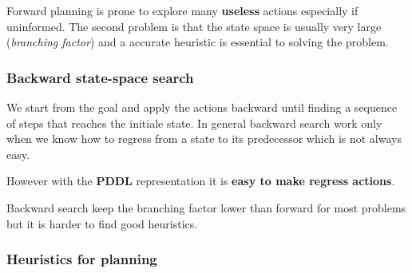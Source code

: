 Forward  planning  is prone  to  explore  many \textbf{useless}  actions
especially if uninformed. The second problem  is that the state space is
usually  very  large  (\textit{branching factor})  and  a  accurate
heuristic is essential to solving the problem.

\subsubsection{Backward state-space search}

We start  from the goal and  apply the actions backward  until finding a
sequence of steps  that reaches the initiale state.  In general backward
search  work  only  when  we  know  how  to  regress  from  a  state  to
its  predecessor  which  is  not  always easy.  

However with the \textbf{PDDL} representation it is \textbf{easy to make regress actions}.

Backward search  keep the  branching factor lower  than forward  for most
problems but it is harder to find good heuristics.


\subsubsection{Heuristics for planning}


